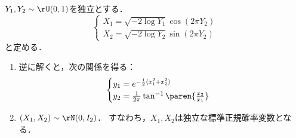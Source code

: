 \documentclass[uplatex,dvipdfmx]{jsreport}
\begin{document}
\begin{proposition}
    $Y_1,Y_2\sim\rU(0,1)$を独立とする．
    \[\begin{cases}
        X_1=\sqrt{-2\log Y_1}\cos(2\pi Y_2)\\
        X_2=\sqrt{-2\log Y_2}\sin(2\pi Y_2)
    \end{cases}\]
    と定める．
    \begin{enumerate}
        \item 逆に解くと，次の関係を得る：
        \[\begin{cases}
            y_1=e^{-\frac{1}{2}(x_1^2+x_2^2)}\\
            y_2=\frac{1}{2\pi}\tan^{-1}\paren{\frac{x_2}{x_1}}
        \end{cases}\]
        \item $(X_1,X_2)\sim\rN(0,I_2)$．
        すなわち，$X_1,X_2$は独立な標準正規確率変数となる．
    \end{enumerate}
\end{proposition}
\end{document}
